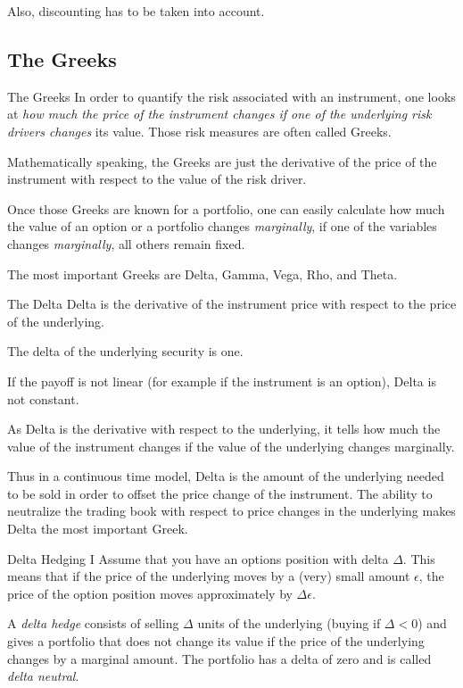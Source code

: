 	Also, discounting has to be taken into account.


\subsection{The Greeks}

The Greeks
	In order to quantify the risk associated with an instrument, one looks at
	\emph{ how much the price of the instrument changes if one of the underlying
	risk drivers changes} its value. Those risk measures are often called
	Greeks.
 
	Mathematically speaking, the Greeks are just the derivative of the price
	of the instrument with respect to the value of the risk driver.
	
	Once those Greeks are known for a portfolio, one can easily calculate how
	much the value of an option or a portfolio changes \emph{marginally}, if one of
	the variables changes \emph{marginally}, all others remain fixed.
	
	The most important Greeks are Delta, Gamma, Vega, Rho, and Theta.


The Delta
	Delta is the derivative of the instrument price with respect to the price
	of the underlying.
	
	The delta of the underlying security is one.
	
	If the payoff is not linear (for example if the instrument is an option),
	Delta is not constant.
	
	As Delta is the derivative with respect to the underlying, it tells how
	much the value of the instrument changes if the value of the underlying changes
	marginally.
	
	Thus in a continuous time model, Delta is the amount of the underlying
	needed to be sold in order to offset the price change of the instrument. The
	ability to neutralize the trading book with respect to price changes in the
	underlying makes Delta the most important Greek.


Delta Hedging I
	Assume that you have an options position with delta $\Delta$. This means
  that if the price of the underlying moves by a (very) small amount $\epsilon$, the
  price of the option position moves approximately by $\Delta \epsilon$.
  
	A \emph{delta hedge} consists of selling $\Delta$ units of the
  underlying (buying if $\Delta <0$) and gives a portfolio that does not
  change its value if the price of the underlying changes by a marginal amount.
  The portfolio has a delta of zero and is called \emph{delta neutral}.


